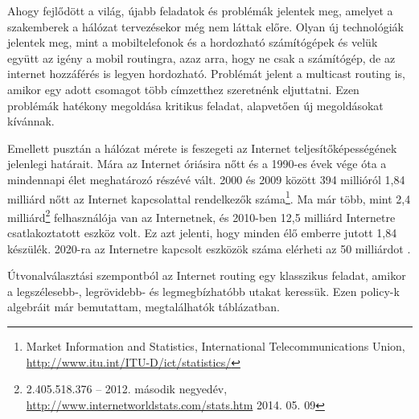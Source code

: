   Ahogy fejlődött a világ, újabb feladatok és problémák jelentek meg, amelyet a szakemberek a hálózat tervezésekor még nem láttak előre. Olyan új technológiák jelentek meg, mint a mobiltelefonok és a hordozható számítógépek és velük együtt az igény a mobil routingra, azaz arra, hogy ne csak a számítógép, de az internet hozzáférés is legyen hordozható. Problémát jelent a multicast routing is, amikor egy adott csomagot több címzetthez szeretnénk eljuttatni. Ezen problémák hatékony megoldása kritikus feladat, alapvetően új megoldásokat kívánnak.

  Emellett pusztán a hálózat mérete is feszegeti az Internet teljesítőképességének jelenlegi határait. Mára az Internet óriásira nőtt és a 1990-es évek vége óta a mindennapi élet meghatározó részévé vált. 2000 és 2009 között 394 millióról 1,84 milliárd nőtt az Internet kapcsolattal rendelkezők száma\footnote{Market Information and Statistics, International Telecommunications Union, \url{http://www.itu.int/ITU-D/ict/statistics/}}. Ma már több, mint 2,4 milliárd\footnote{2.405.518.376 -- 2012. második negyedév, \url{http://www.internetworldstats.com/stats.htm} 2014. 05. 09} felhasználója van az Internetnek, és 2010-ben 12,5 milliárd Internetre csatlakoztatott eszköz volt. Ez azt jelenti, hogy minden élő emberre jutott 1,84 készülék. 2020-ra az Internetre kapcsolt eszközök száma elérheti az 50 milliárdot \cite{The_Internet_of_Things}.\newpage

  Útvonalválasztási szempontból az Internet routing egy klasszikus feladat, amikor a legszélesebb-, legrövidebb- és legmegbízhatóbb utakat keressük. Ezen policy-k algebráit már bemutattam, megtalálhatók  táblázatban.

